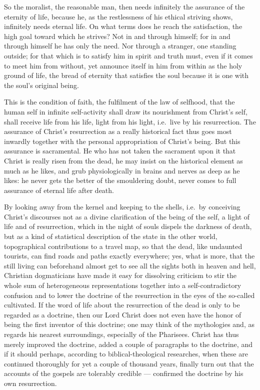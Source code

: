 \documentclass[12pt,a4paper,openany]{book}
\newcommand{\opage}[1]{\marginnote{\footnotesize\textit{[#1]}}}
\begin{document}
So the moralist, the reasonable man, then needs
infinitely the assurance of the eternity of life, because he,
as the restlessness of his ethical striving shows, infinitely needs
eternal life.  On what terms does he reach the satisfaction,
the high goal toward which he strives?  Not in
\setcounter{footnote}{0}%
\opage{216}and through himself; for in and through himself he has only the need.  Nor through a stranger, one standing outside;
for that which is to satisfy him in spirit and truth
must, even if it comes to meet him from without, yet
announce itself in him from within as the holy ground of life,
the bread of eternity that satisfies the soul because it is one with
the soul's original being.

This is the condition of faith, the fulfilment of the law of selfhood,
that the human self in infinite self-activity shall
draw its nourishment from Christ's self, shall receive life from his
life, light from his light, i.e.\ live by his resurrection.
The assurance of Christ's resurrection as a really historical
fact thus goes most inwardly together
with the personal appropriation of Christ's being.  But
this assurance is sacramental.  He who has not
taken the sacrament upon it that Christ is really risen
from the dead, he may insist on the historical element as much as
he likes, and grub physiologically in brains and nerves as deep as
he likes: he never gets the better of the smouldering doubt,
never comes to full assurance of eternal life after
death.

By looking away from the kernel and keeping to the shells,
i.e.\ by conceiving Christ's discourses not as a
divine clarification of the being of the self, a light of life and
of resurrection, which in the night of souls dispels the darkness
of death, but as a kind of statistical description of the state
in the other world, topographical contributions to a
travel map, so that the dead, like undaunted tourists, can
find roads and paths exactly everywhere; yes, what is more,
that the still living can beforehand almost
get to see all the sights both in heaven and hell,
\setcounter{footnote}{0}%
\opage{217}Christian dogmaticians have made it easy for dissolving
criticism to stir the whole sum of heterogeneous
representations together into a self-contradictory confusion and to lower
the doctrine of the resurrection in the eyes of the so-called cultivated.
If the word of life about the resurrection of the dead is only to be
regarded as a doctrine, then our Lord Christ does not
even have the honor of being the first inventor of this doctrine;
one may think of the mythologies and, as regards his nearest
surroundings, especially of the Pharisees.  Christ has
thus merely improved the doctrine, added a couple of paragraphs to
the doctrine, and if it should perhaps, according to biblical-theological
researches, when these are continued thoroughly for yet
a couple of thousand years, finally turn out that the accounts of the gospels
are tolerably credible --- confirmed
the doctrine by his own resurrection.
\end{document}
